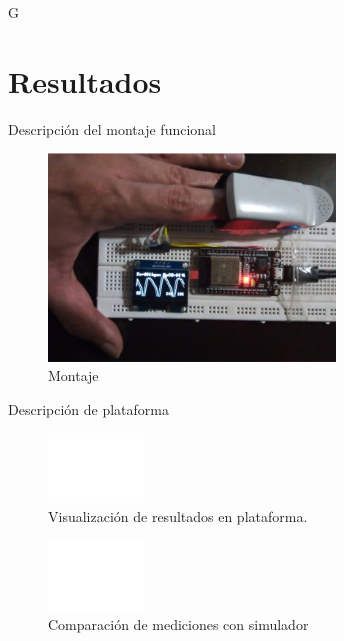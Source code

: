 \documentclass[journal]{IEEEtran}
\begin{document}
{\color{blue}G}
\section{Resultados}

Descripción del montaje funcional



\begin{figure}[!h]
	\centering
	\includegraphics[width=3in]{montaje_final.png}
	\caption{Montaje}
	\label{montaje_generador_rpi}
\end{figure}


Descripción de plataforma

\begin{figure}[!h]
	\centering
	\includegraphics[width=1in]{plataforma.png}
	\caption{Visualización de resultados en plataforma.}
	\label{montaje_generador_rpi}
\end{figure}

\begin{figure}[!h]
	\centering
	\includegraphics[width=1in]{Validacion_resultados.png}
	\caption{Comparación de mediciones con simulador}
	\label{montaje_generador_rpi}
\end{figure}
\end{document}

